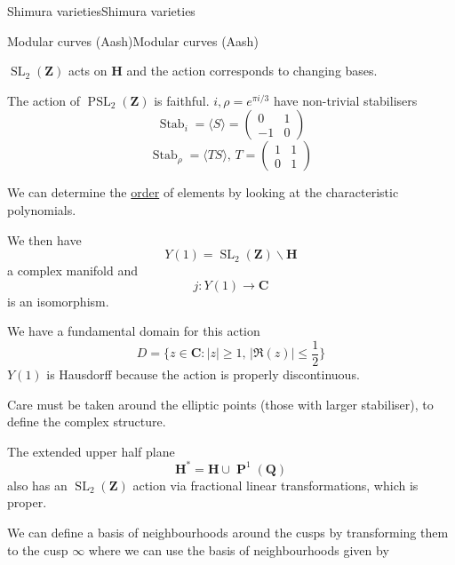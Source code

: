 \documentclass[10pt,]{book}
\numberwithin{equation}{section}
\newcommand{\ZZ}{\mathbf{Z}}
\newcommand{\QQ}{\mathbf{Q}}
\newcommand{\CC}{\mathbf{C}}
\newcommand{\HH}{\mathbf{H}}
\DeclareMathOperator{\Stab}{Stab}
\DeclareMathOperator{\PP}{\mathbf{P}}
\DeclareMathOperator{\SL}{SL}
\DeclareMathOperator{\PSL}{PSL}
\newcommand{\amp}{&}
\begin{document}
\begin{chapterptx}{Shimura varieties}{}{Shimura varieties}{}{}
\begin{sectionptx}{Modular curves (Aash)}{}{Modular curves (Aash)}{}{}
\par
\hypertarget{p-1024}{}%
\(\SL_2(\ZZ)\) acts on \(\HH\) and the action corresponds to changing bases.%
\par
\hypertarget{p-1025}{}%
The action of \(\PSL_2(\ZZ)\) is faithful. \(i,\rho = e^{\pi i /3}\) have non-trivial stabilisers%
\begin{equation*}
\Stab_i =  \langle S\rangle = \begin{pmatrix} 0\amp1 \\ -1 \amp 0 \end{pmatrix}
\end{equation*}
%
\begin{equation*}
\Stab_\rho =  \langle TS\rangle,\,T = \begin{pmatrix} 1\amp1 \\ 0 \amp 1 \end{pmatrix}
\end{equation*}
%
\par
\hypertarget{p-1026}{}%
We can determine the \hyperref[def-order-quaternion]{order} of elements by looking at the characteristic polynomials.%
\par
\hypertarget{p-1027}{}%
We then have%
\begin{equation*}
Y(1) =\SL_2(\ZZ) \backslash \HH
\end{equation*}
a complex manifold and%
\begin{equation*}
j\colon Y(1) \to \CC
\end{equation*}
is an isomorphism.%
\par
\hypertarget{p-1028}{}%
We have a fundamental domain for this action%
\begin{equation*}
D = \{ z\in \CC : |z|  \ge 1,\, |\Re(z)| \le \frac 12 \}
\end{equation*}
\(Y(1)\) is Hausdorff because the action is properly discontinuous.%
\par
\hypertarget{p-1029}{}%
Care must be taken around the elliptic points (those with larger stabiliser), to define the complex structure.%
\par
\hypertarget{p-1030}{}%
The extended upper half plane%
\begin{equation*}
\HH^* = \HH \cup \PP^1 (\QQ)
\end{equation*}
also has an \(\SL_2(\ZZ)\) action via fractional linear transformations, which is proper.%
\par
\hypertarget{p-1031}{}%
We can define a basis of neighbourhoods around the cusps by transforming them to the cusp \(\infty\) where we can use the basis of neighbourhoods given by%

\end{sectionptx}
\end{chapterptx}
\end{document}
